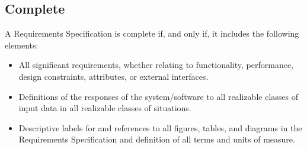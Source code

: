 \documentclass[Main]{subfiles}
\begin{document}
\subsection{Complete}
A Requirements Specification is complete if, and only if, it includes the following elements:
\begin{itemize}
\item All significant requirements, whether relating to functionality, performance, design constraints, attributes, or external interfaces.
\item Definitions of the responses of the system/software to all realizable classes of input data in all realizable classes of situations.
\item Descriptive labels for and references to all figures, tables, and diagrams in the Requirements Specification and definition of all terms and units of measure.

\end{itemize}
\end{document}
